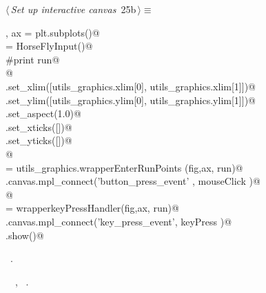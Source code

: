 \documentclass[11.5pt]{report}
\begin{document}
\vspace{-0.8cm}\newchunk 
\begin{flushleft} \small\label{scrap29}\raggedright\small
{} $\langle\,${\itshape Set up interactive canvas}\nobreak\ {\footnotesize {25b}}$\,\rangle\equiv$
\vspace{-1ex}
\begin{list}{}{} \item
\mbox{}\verb@fig, ax =  plt.subplots()@\\
\mbox{}\verb@run = HorseFlyInput()@\\
\mbox{}\verb@#print run@\\
\mbox{}\verb@    @\\
\mbox{}\verb@ax.set_xlim([utils_graphics.xlim[0], utils_graphics.xlim[1]])@\\
\mbox{}\verb@ax.set_ylim([utils_graphics.ylim[0], utils_graphics.ylim[1]])@\\
\mbox{}\verb@ax.set_aspect(1.0)@\\
\mbox{}\verb@ax.set_xticks([])@\\
\mbox{}\verb@ax.set_yticks([])@\\
\mbox{}\verb@      @\\
\mbox{}\verb@mouseClick   = utils_graphics.wrapperEnterRunPoints (fig,ax, run)@\\
\mbox{}\verb@fig.canvas.mpl_connect('button_press_event' , mouseClick )@\\
\mbox{}\verb@      @\\
\mbox{}\verb@keyPress     = wrapperkeyPressHandler(fig,ax, run)@\\
\mbox{}\verb@fig.canvas.mpl_connect('key_press_event', keyPress   )@\\
\mbox{}\verb@plt.show()@\\
\mbox{}\verb@@{\NWsep}
\end{list}
\vspace{-1.5ex}
\footnotesize
\begin{list}{}{\setlength{\itemsep}{-\parsep}\setlength{\itemindent}{-\leftmargin}}
\item \NWtxtMacroRefIn\ .
\item \NWtxtIdentsUsed\nobreak\  \verb@HorseFlyInput@\nobreak\ , \verb@wrapperkeyPressHandler@\nobreak\ .
\item{}
\end{list}
\vspace{4ex}
\end{flushleft}
\end{document}
